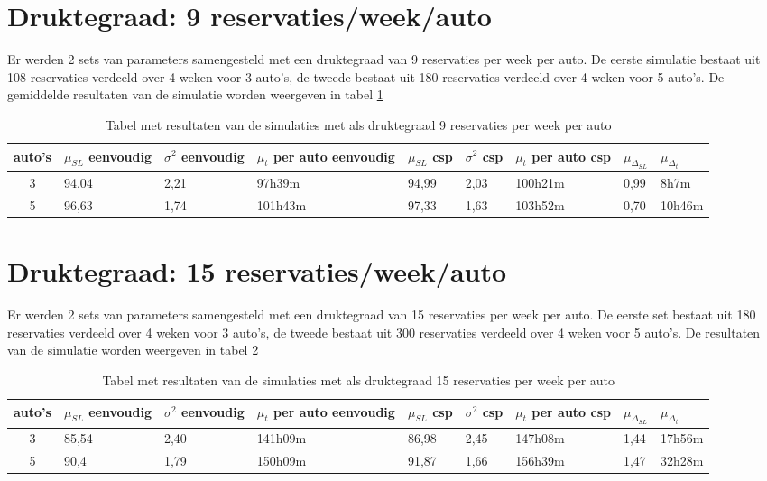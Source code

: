 \section{Druktegraad: 9 reservaties/week/auto}
Er werden 2 sets van parameters samengesteld met een druktegraad van 9 reservaties per week per auto. 
De eerste simulatie bestaat uit 108 reservaties verdeeld over 4 weken voor 3 auto's, de tweede bestaat uit 180 reservaties verdeeld over 4 weken voor 5 auto's. 
De gemiddelde resultaten van de simulatie worden weergeven in tabel \ref{tab:resultaten9}
\begin{table}[h]
	\centering
	\begin{tabular}{ | c | p{1.5cm} | p{1.5cm} | p{1.5cm} | p{1.5cm} | p{1.5cm} | p{1.5cm} | p{1.5cm} | p{1.5cm} |}
		\hline
		auto's & $\mu_{ SL}$ eenvoudig & $\sigma^2$ eenvoudig & $\mu_{ t}$ per auto eenvoudig & $\mu_{ SL}$ csp & $\sigma^2$ csp & $\mu_{ t}$ per auto csp & $\mu_{\Delta_{ SL}}$ & $\mu_{\Delta_{ t}}$ \\ \hline
		3 & 94,04 & 2,21 & 97h39m & 94,99 & 2,03 & 100h21m & 0,99 & 8h7m  \\ \hline
		5 & 96,63 & 1,74 & 101h43m & 97,33 & 1,63 & 103h52m & 0,70 & 10h46m \\ \hline
	\end{tabular}
	\caption{Tabel met resultaten van de simulaties met als druktegraad 9 reservaties per week per auto}
	\label{tab:resultaten9}
\end{table}

\section{Druktegraad: 15 reservaties/week/auto}
Er werden 2 sets van parameters samengesteld met een druktegraad van 15 reservaties per week per auto. 
De eerste set bestaat uit 180 reservaties verdeeld over 4 weken voor 3 auto's, de tweede bestaat uit 300 reservaties verdeeld over 4 weken voor 5 auto's. 
De resultaten van de simulatie worden weergeven in tabel \ref{tab:resultaten15}
\begin{table}[h]
	\centering
	\begin{tabular}{ | c | p{1.5cm} | p{1.5cm} | p{1.5cm} | p{1.5cm} | p{1.5cm} | p{1.5cm} | p{1.5cm} | p{1.5cm} |}
		\hline
		auto's & $\mu_{ SL}$ eenvoudig & $\sigma^2$ eenvoudig & $\mu_{ t}$ per auto eenvoudig & $\mu_{ SL}$ csp & $\sigma^2$ csp & $\mu_{ t}$ per auto csp & $\mu_{\Delta_{ SL}}$ & $\mu_{\Delta_{ t}}$ \\ \hline
		3 & 85,54 & 2,40 & 141h09m & 86,98 & 2,45 & 147h08m & 1,44 & 17h56m  \\ \hline
		5 & 90,4 & 1,79 & 150h09m & 91,87 & 1,66 & 156h39m & 1,47 & 32h28m \\ \hline
	\end{tabular}
	\caption{Tabel met resultaten van de simulaties met als druktegraad 15 reservaties per week per auto}
	\label{tab:resultaten15}
\end{table}
